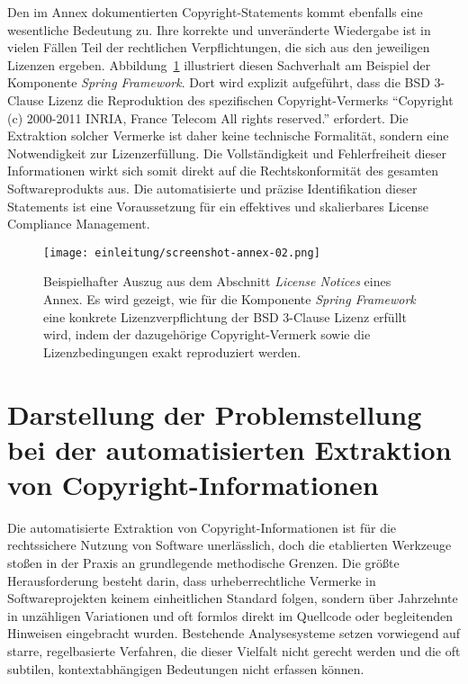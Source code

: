 Den im Annex dokumentierten Copyright-Statements kommt ebenfalls eine wesentliche Bedeutung zu.
Ihre korrekte und unveränderte Wiedergabe ist in vielen Fällen Teil der rechtlichen Verpflichtungen, die sich aus den jeweiligen Lizenzen ergeben.
Abbildung~\ref{fig:annex-02} illustriert diesen Sachverhalt am Beispiel der Komponente \textit{Spring Framework}.
Dort wird explizit aufgeführt, dass die BSD 3-Clause Lizenz die Reproduktion des spezifischen Copyright-Vermerks \enquote{Copyright (c) 2000-2011 INRIA, France Telecom All rights reserved.} erfordert.
Die Extraktion solcher Vermerke ist daher keine technische Formalität, sondern eine Notwendigkeit zur Lizenzerfüllung.
Die Vollständigkeit und Fehlerfreiheit dieser Informationen wirkt sich somit direkt auf die Rechtskonformität des gesamten Softwareprodukts aus.
Die automatisierte und präzise Identifikation dieser Statements ist eine Voraussetzung für ein effektives und skalierbares License Compliance Management.

\begin{figure}[ht]
    \centering
    \texttt{[image: einleitung/screenshot-annex-02.png]}
    \caption{Beispielhafter Auszug aus dem Abschnitt \textit{License Notices} eines Annex. Es wird gezeigt, wie für die Komponente \textit{Spring Framework} eine konkrete Lizenzverpflichtung der BSD 3-Clause Lizenz erfüllt wird, indem der dazugehörige Copyright-Vermerk sowie die Lizenzbedingungen exakt reproduziert werden.}
    \label{fig:annex-02}
\end{figure}


\section{Darstellung der Problemstellung bei der automatisierten Extraktion von Copyright-Informationen}\label{sec:problemstellung}

Die automatisierte Extraktion von Copyright-Informationen ist für die rechtssichere Nutzung von Software unerlässlich, doch die etablierten Werkzeuge stoßen in der Praxis an grundlegende methodische Grenzen.
Die größte Herausforderung besteht darin, dass urheberrechtliche Vermerke in Softwareprojekten keinem einheitlichen Standard folgen, sondern über Jahrzehnte in unzähligen Variationen und oft formlos direkt im Quellcode oder begleitenden Hinweisen eingebracht wurden.
Bestehende Analysesysteme setzen vorwiegend auf starre, regelbasierte Verfahren, die dieser Vielfalt nicht gerecht werden und die oft subtilen, kontextabhängigen Bedeutungen nicht erfassen können.

